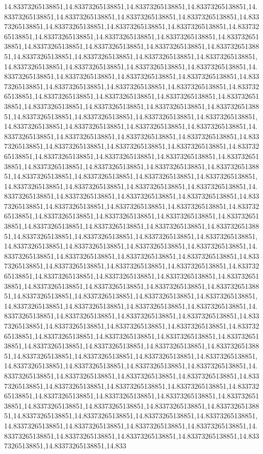 14.83373265138851,14.83373265138851,14.83373265138851,14.83373265138851,14.83373265138851,14.83373265138851,14.83373265138851,14.83373265138851,14.83373265138851,14.83373265138851,14.83373265138851,14.83373265138851,14.83373265138851,14.83373265138851,14.83373265138851,14.83373265138851,14.83373265138851,14.83373265138851,14.83373265138851,14.83373265138851,14.83373265138851,14.83373265138851,14.83373265138851,14.83373265138851,14.83373265138851,14.83373265138851,14.83373265138851,14.83373265138851,14.83373265138851,14.83373265138851,14.83373265138851,14.83373265138851,14.83373265138851,14.83373265138851,14.83373265138851,14.83373265138851,14.83373265138851,14.83373265138851,14.83373265138851,14.83373265138851,14.83373265138851,14.83373265138851,14.83373265138851,14.83373265138851,14.83373265138851,14.83373265138851,14.83373265138851,14.83373265138851,14.83373265138851,14.83373265138851,14.83373265138851,14.83373265138851,14.83373265138851,14.83373265138851,14.83373265138851,14.83373265138851,14.83373265138851,14.83373265138851,14.83373265138851,14.83373265138851,14.83373265138851,14.83373265138851,14.83373265138851,14.83373265138851,14.83373265138851,14.83373265138851,14.83373265138851,14.83373265138851,14.83373265138851,14.83373265138851,14.83373265138851,14.83373265138851,14.83373265138851,14.83373265138851,14.83373265138851,14.83373265138851,14.83373265138851,14.83373265138851,14.83373265138851,14.83373265138851,14.83373265138851,14.83373265138851,14.83373265138851,14.83373265138851,14.83373265138851,14.83373265138851,14.83373265138851,14.83373265138851,14.83373265138851,14.83373265138851,14.83373265138851,14.83373265138851,14.83373265138851,14.83373265138851,14.83373265138851,14.83373265138851,14.83373265138851,14.83373265138851,14.83373265138851,14.83373265138851,14.83373265138851,14.83373265138851,14.83373265138851,14.83373265138851,14.83373265138851,14.83373265138851,14.83373265138851,14.83373265138851,14.83373265138851,14.83373265138851,14.83373265138851,14.83373265138851,14.83373265138851,14.83373265138851,14.83373265138851,14.83373265138851,14.83373265138851,14.83373265138851,14.83373265138851,14.83373265138851,14.83373265138851,14.83373265138851,14.83373265138851,14.83373265138851,14.83373265138851,14.83373265138851,14.83373265138851,14.83373265138851,14.83373265138851,14.83373265138851,14.83373265138851,14.83373265138851,14.83373265138851,14.83373265138851,14.83373265138851,14.83373265138851,14.83373265138851,14.83373265138851,14.83373265138851,14.83373265138851,14.83373265138851,14.83373265138851,14.83373265138851,14.83373265138851,14.83373265138851,14.83373265138851,14.83373265138851,14.83373265138851,14.83373265138851,14.83373265138851,14.83373265138851,14.83373265138851,14.83373265138851,14.83373265138851,14.83373265138851,14.83373265138851,14.83373265138851,14.83373265138851,14.83373265138851,14.83373265138851,14.83373265138851,14.83373265138851,14.83373265138851,14.83373265138851,14.83373265138851,14.83373265138851,14.83373265138851,14.83373265138851,14.83373265138851,14.83373265138851,14.83373265138851,14.83373265138851,14.83373265138851,14.83373265138851,14.83373265138851,14.83373265138851,14.83373265138851,14.83373265138851,14.83373265138851,14.83373265138851,14.83373265138851,14.83373265138851,14.83373265138851,14.83373265138851,14.83373265138851,14.833